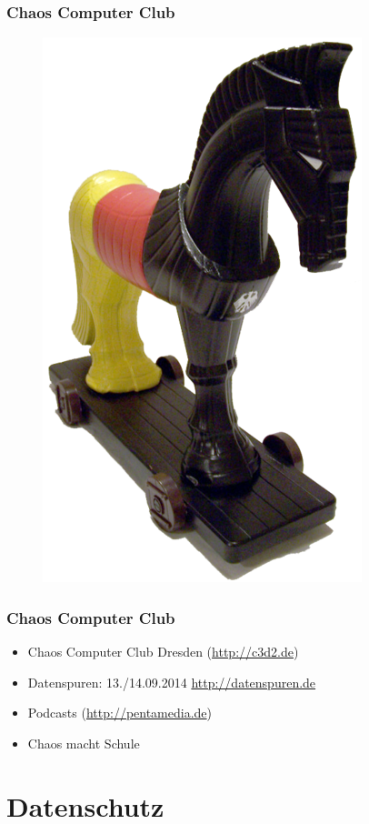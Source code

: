 \documentclass[12pt]{beamer}
\begin{document}
\begin{frame}
  \frametitle{Chaos Computer Club}
  \begin{figure}
    \includegraphics[height=0.7\textheight]{img/trojaner.png}
  \end{figure}
\end{frame}

\begin{frame}
    \frametitle{Chaos Computer Club}
    \begin{itemize}
      \item<1-> Chaos Computer Club Dresden (\url{http://c3d2.de})
          \note{}
      \item<2-> Datenspuren: 13./14.09.2014 \url{http://datenspuren.de}
      \item<3-> Podcasts (\url{http://pentamedia.de})
      \item<4-> Chaos macht Schule
    \end{itemize}
\end{frame}

\section{Datenschutz}
\end{document}
